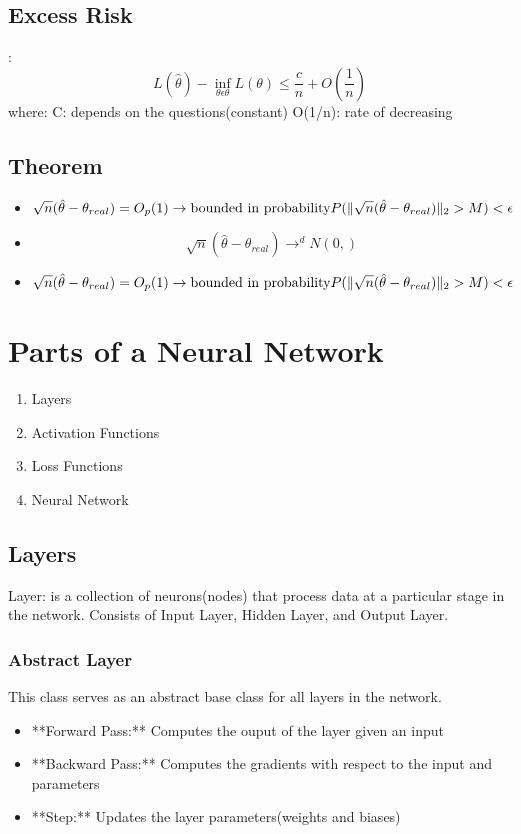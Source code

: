 \documentclass{article}
\begin{document}
\subsection*{Excess Risk}:
\[
L(\hat{\theta}) - \inf_{\theta \epsilon \theta}L(\theta) \leq  \frac{c}{n} + O(\frac{1}{n})
\]
where:
C: depends on the questions(constant)
O(1/n): rate of decreasing

\subsection*{Theorem}
\begin{itemize}
  \item 
  \[
    \sqrt{n}(\hat{\theta} - \theta_{real}) = O_p(1) \rightarrow \text{bounded in probability} \\
    P(\Vert \sqrt{n}(\hat{\theta} - \theta_{real})\Vert_2 > M) < \epsilon
  \]
  \item 
  \[
    \sqrt{n}(\hat{\theta} - \theta_{real}) \rightarrow^{d} N(0,)
  \]
  \item 
  \[
    \sqrt{n}(\hat{\theta} - \theta_{real}) = O_p(1) \rightarrow \text{bounded in probability} \\
    P(\Vert \sqrt{n}(\hat{\theta} - \theta_{real})\Vert_2 > M) < \epsilon
  \]
  
  
\end{itemize}

\section*{Parts of a Neural Network}
\begin{enumerate}
  \item Layers
  \item Activation Functions
  \item Loss Functions
  \item Neural Network
\end{enumerate}
\subsection*{Layers}
Layer: is a collection of neurons(nodes) that process data at a particular stage in the network. Consists of Input Layer, Hidden Layer, and Output Layer.
\subsubsection*{Abstract Layer}
This class serves as an abstract base class for all layers in the network.
\begin{itemize}
  \item **Forward Pass:** Computes the ouput of the layer given an input
  \item **Backward Pass:** Computes the gradients with respect to the input and parameters
  \item **Step:** Updates the layer parameters(weights and biases)
\end{itemize}
\end{document}
